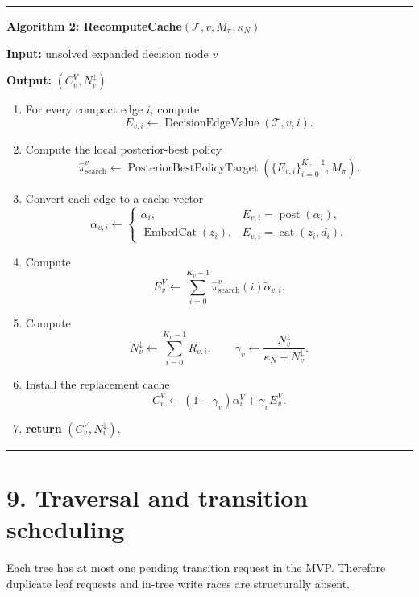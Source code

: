 \documentclass[11pt]{article}
\newcommand{\Tree}{\mathcal{T}}
\newcommand{\Cat}{\operatorname{cat}}
\newcommand{\Posterior}{\operatorname{post}}
\newcommand{\EmbedCat}{\operatorname{EmbedCat}}
\newcommand{\DecisionEdgeValue}{\operatorname{DecisionEdgeValue}}
\newcommand{\PosteriorBestPolicyTarget}{\operatorname{PosteriorBestPolicyTarget}}
\newenvironment{algorithmblock}[1]
{
  \par\medskip
  \noindent\hrule\par\smallskip
  \noindent\textbf{#1}
  \par\smallskip
}
{
  \par\smallskip\noindent\hrule\par\medskip
}
\newcommand{\Input}{\textbf{Input: }}
\newcommand{\Output}{\textbf{Output: }}
\newcommand{\Return}{\textbf{return }}
\begin{document}
\begin{algorithmblock}{Algorithm 2: RecomputeCache\((\Tree,v,M_\pi,\kappa_N)\)}

\Input unsolved expanded decision node \(v\)

\Output \((C^V_v,N^\downarrow_v)\)

\begin{enumerate}[leftmargin=2em]
  \item For every compact edge \(i\), compute
  \[
  E_{v,i}\gets\DecisionEdgeValue(\Tree,v,i).
  \]

  \item Compute the local posterior-best policy
  \[
  \hat\pi_{\mathrm{search}}^v
  \gets
  \PosteriorBestPolicyTarget(\{E_{v,i}\}_{i=0}^{K_v-1},M_\pi).
  \]

  \item Convert each edge to a cache vector
  \[
  \widetilde\alpha_{v,i}\gets
  \begin{cases}
  \alpha_i,&E_{v,i}=\Posterior(\alpha_i),\\
  \EmbedCat(z_i),&E_{v,i}=\Cat(z_i,d_i).
  \end{cases}
  \]

  \item Compute
  \[
  E^V_v\gets
  \sum_{i=0}^{K_v-1}
  \hat\pi_{\mathrm{search}}^v(i)\widetilde\alpha_{v,i}.
  \]

  \item Compute
  \[
  N^\downarrow_v\gets\sum_{i=0}^{K_v-1}R_{v,i},
  \qquad
  \gamma_v\gets\frac{N^\downarrow_v}{\kappa_N+N^\downarrow_v}.
  \]

  \item Install the replacement cache
  \[
  C^V_v\gets(1-\gamma_v)\alpha_v^V+\gamma_v E^V_v.
  \]

  \item \Return \((C^V_v,N^\downarrow_v)\).
\end{enumerate}

\end{algorithmblock}

\section*{9. Traversal and transition scheduling}

Each tree has at most one pending transition request in the MVP. Therefore
duplicate leaf requests and in-tree write races are structurally absent.
\end{document}
